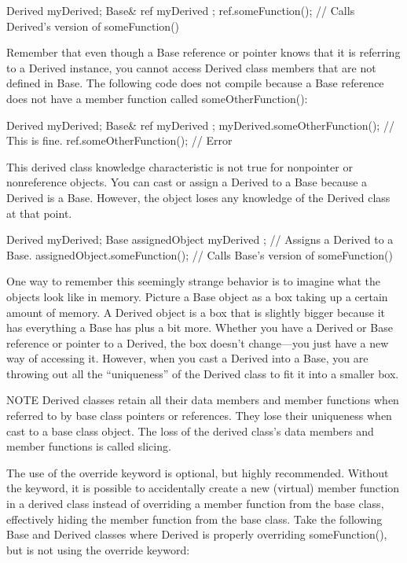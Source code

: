 \begin{cpp}
Derived myDerived;
Base& ref { myDerived };
ref.someFunction(); // Calls Derived's version of someFunction()
\end{cpp}

Remember that even though a Base reference or pointer knows that it is referring to a Derived instance, you cannot access Derived class members that are not defined in Base. The following code does not compile because a Base reference does not have a member function called someOtherFunction():

\begin{cpp}
Derived myDerived;
Base& ref { myDerived };
myDerived.someOtherFunction(); // This is fine.
ref.someOtherFunction(); // Error
\end{cpp}

This derived class knowledge characteristic is not true for nonpointer or nonreference objects. You can cast or assign a Derived to a Base because a Derived is a Base. However, the object loses any knowledge of the Derived class at that point.

\begin{cpp}
Derived myDerived;
Base assignedObject { myDerived }; // Assigns a Derived to a Base.
assignedObject.someFunction(); // Calls Base's version of someFunction()
\end{cpp}

One way to remember this seemingly strange behavior is to imagine what the objects look like in memory. Picture a Base object as a box taking up a certain amount of memory. A Derived object is a box that is slightly bigger because it has everything a Base has plus a bit more. Whether you have a Derived or Base reference or pointer to a Derived, the box doesn’t change—you just have a new way of accessing it. However, when you cast a Derived into a Base, you are throwing out all the “uniqueness” of the Derived class to fit it into a smaller box.

\begin{myNotic}{NOTE}
Derived classes retain all their data members and member functions when referred to by base class pointers or references. They lose their uniqueness when cast to a base class object. The loss of the derived class’s data members and member functions is called slicing.
\end{myNotic}


The use of the override keyword is optional, but highly recommended. Without the keyword, it is possible to accidentally create a new (virtual) member function in a derived class instead of overriding a member function from the base class, effectively hiding the member function from the base class. Take the following Base and Derived classes where Derived is properly overriding someFunction(), but is not using the override keyword:

